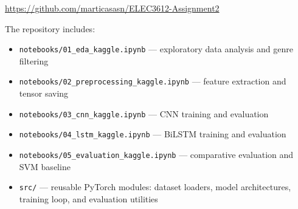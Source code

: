 \documentclass[12pt, a4paper]{article}
\begin{document}
\begin{center}
\url{https://github.com/marticasasn/ELEC3612-Assignment2}
\end{center}

The repository includes:
\begin{itemize}[noitemsep, topsep=4pt]
    \item \texttt{notebooks/01\_eda\_kaggle.ipynb} --- exploratory data analysis and
          genre filtering
    \item \texttt{notebooks/02\_preprocessing\_kaggle.ipynb} --- feature extraction
          and tensor saving
    \item \texttt{notebooks/03\_cnn\_kaggle.ipynb} --- CNN training and evaluation
    \item \texttt{notebooks/04\_lstm\_kaggle.ipynb} --- BiLSTM training and evaluation
    \item \texttt{notebooks/05\_evaluation\_kaggle.ipynb} --- comparative evaluation
          and SVM baseline
    \item \texttt{src/} --- reusable PyTorch modules: dataset loaders, model
          architectures, training loop, and evaluation utilities
\end{itemize}
\end{document}
